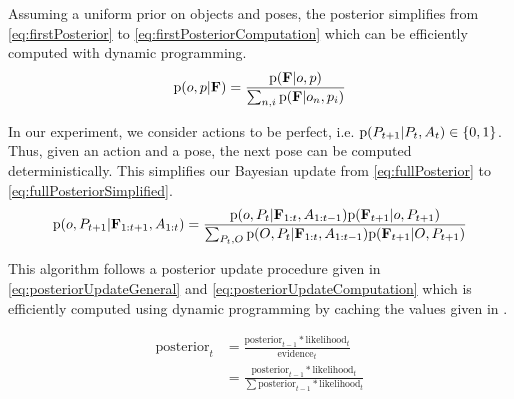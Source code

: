             Assuming a uniform prior on objects and poses, the posterior simplifies from \eqref{eq:firstPosterior} to \eqref{eq:firstPosteriorComputation} which can be efficiently computed with dynamic programming.
            \begin{equation}
                \label{eq:firstPosteriorComputation}
                \text{p}(o,p|\mathbf{F}) = \frac{\text{p}(\mathbf{F}|o,p)}{\sum_{n,i} \text{p}(\mathbf{F}|o_n,p_i)}
            \end{equation}

            In our experiment, we consider actions to be perfect, i.e. $\text{p}(P_{t+1}|P_t,A_t) \in \{ 0 , 1 \}$. Thus, given an action and a pose, the next pose can be computed deterministically. This simplifies our Bayesian update from \eqref{eq:fullPosterior} to \eqref{eq:fullPosteriorSimplified}.
            \begin{equation}
                \label{eq:fullPosteriorSimplified}
                \text{p}(o,P_{t+1}|\mathbf{F}_{1:t+1},A_{1:t}) = \frac{\text{p}(o,P_t|\mathbf{F}_{1:t},A_{1:t-1}) \text{p}(\mathbf{F}_{t+1}|o,P_{t+1}) }{\sum_{P_t,O} \text{p}(O,P_t|\mathbf{F}_{1:t},A_{1:t-1}) \text{p}(\mathbf{F}_{t+1}|O,P_{t+1}) }
            \end{equation}

            This algorithm follows a posterior update procedure given in \eqref{eq:posteriorUpdateGeneral} and \eqref{eq:posteriorUpdateComputation} which is efficiently computed using dynamic programming by caching the values given in .

            \begin{align}
                \label{eq:posteriorUpdateGeneral}
                \text{posterior}_t &= \frac{\text{posterior}_{t-1}*\text{likelihood}_t}{\text{evidence}_t}\\
                \label{eq:posteriorUpdateComputation}
                &= \frac{\text{posterior}_{t-1}*\text{likelihood}_t}{\sum \text{posterior}_{t-1}*\text{likelihood}_t}
            \end{align}

